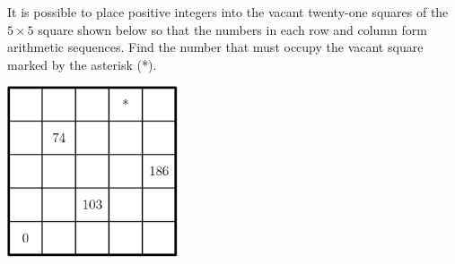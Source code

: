 It is possible to place positive integers into the vacant twenty-one squares of the $5 \times 5$ square shown below so that the numbers in each row and column form arithmetic sequences.  Find the number that must occupy the vacant square marked by the asterisk (*).

\begin{center}
\includegraphics[width = 50.400000000000006mm]{img/fig0.png}
\end{center}